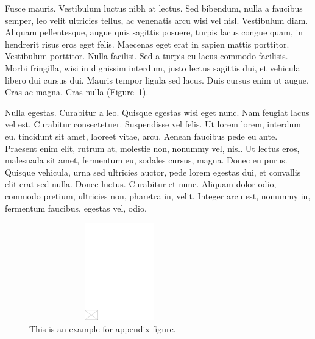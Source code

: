 \documentclass[AMA,Times1COL]{WileyNJDv5} %
\begin{document}
%
\vspace*{12pt}
Fusce mauris. Vestibulum luctus nibh at lectus. Sed bibendum, nulla a faucibus semper, leo velit ultricies tellus, ac
venenatis arcu wisi vel nisl. Vestibulum diam. Aliquam pellentesque, augue quis sagittis posuere, turpis lacus congue
quam, in hendrerit risus eros eget felis. Maecenas eget erat in sapien mattis porttitor. Vestibulum porttitor. Nulla
facilisi. Sed a turpis eu lacus commodo facilisis. Morbi fringilla, wisi in dignissim interdum, justo lectus sagittis dui, et
vehicula libero dui cursus dui. Mauris tempor ligula sed lacus. Duis cursus enim ut augue. Cras ac magna. Cras nulla (Figure~\ref{fig5}).

Nulla egestas. Curabitur a leo. Quisque egestas wisi eget nunc. Nam feugiat lacus vel est. Curabitur consectetuer.
Suspendisse vel felis. Ut lorem lorem, interdum eu, tincidunt sit amet, laoreet vitae, arcu. Aenean faucibus pede eu
ante. Praesent enim elit, rutrum at, molestie non, nonummy vel, nisl. Ut lectus eros, malesuada sit amet, fermentum
eu, sodales cursus, magna. Donec eu purus. Quisque vehicula, urna sed ultricies auctor, pede lorem egestas dui, et
convallis elit erat sed nulla. Donec luctus. Curabitur et nunc. Aliquam dolor odio, commodo pretium, ultricies non,
pharetra in, velit. Integer arcu est, nonummy in, fermentum faucibus, egestas vel, odio.

\begin{figure}[b]
\centerline{\includegraphics[height=10pc,width=78mm,draft]{empty}}
\caption{This is an example for appendix figure.\label{fig5}}
\end{figure}
\end{document}
